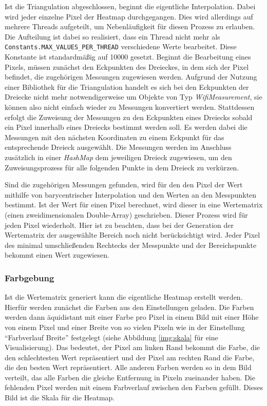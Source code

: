 \documentclass[10pt]{scrartcl}
\newcommand{\inlcode}{\texttt}
\begin{document}
Ist die Triangulation abgeschlossen, beginnt die eigentliche Interpolation. Dabei wird jeder einzelne Pixel der Heatmap durchgegangen. Dies wird allerdings auf mehrere Threads aufgeteilt, um Nebenläufigkeit für diesen Prozess zu erlauben. Die Aufteilung ist dabei so realisiert, dass ein Thread nicht mehr als \inlcode{Constants.MAX\_VALUES\_PER\_THREAD} verschiedene Werte bearbeitet. Diese Konstante ist standardmäßig auf 10000 gesetzt. Beginnt die Bearbeitung eines Pixels, müssen zunächst den Eckpunkten des Dreieckes, in dem sich der Pixel befindet, die zugehörigen Messungen zugewiesen werden. Aufgrund der Nutzung einer Bibliothek für die Triangulation handelt es sich bei den Eckpunkten der Dreiecke nicht mehr notwendigerweise um Objekte von Typ \textit{WifiMeasurement}, sie können also nicht einfach wieder zu Messungen konvertiert werden. Stattdessen erfolgt die Zuweisung der Messungen zu den Eckpunkten eines Dreiecks sobald ein Pixel innerhalb eines Dreiecks bestimmt werden soll. Es werden dabei die Messungen mit den nächsten Koordinaten zu einem Eckpunkt für das entsprechende Dreieck ausgewählt. Die Messungen werden im Anschluss zusätzlich in einer \textit{HashMap} dem jeweiligen Dreieck zugewiesen, um den Zuweisungsprozess für alle folgenden Punkte in dem Dreieck zu verkürzen.

Sind die zugehörigen Messungen gefunden, wird für den den Pixel der Wert mithilfe von barycentrischer Interpolation und den Werten an den Messpunkten bestimmt. Ist der Wert für einen Pixel berechnet, wird dieser in eine Wertematrix (einen zweidimensionalen Double-Array) geschrieben. Dieser Prozess wird für jeden Pixel wiederholt. Hier ist zu beachten, dass bei der Generation der Wertematrix der ausgewählte Bereich noch nicht berücksichtigt wird. Jeder Pixel des minimal umschließenden Rechtecks der Messpunkte und der Bereichspunkte bekommt einen Wert zugewiesen.

\subsubsection{Farbgebung}
\label{Farbgebung}
Ist die Wertematrix generiert kann die eigentliche Heatmap erstellt werden. Hierfür werden zunächst die Farben aus den Einstellungen geladen. Die Farben werden dann äquidistant mit einer Farbe pro Pixel in einem Bild mit einer Höhe von einem Pixel und einer Breite von so vielen Pixeln wie in der Einstellung \enquote{Farbverlauf Breite} festgelegt (siehe Abbildung \ref{img:skala} für eine Visualisierung). Das bedeutet, der Pixel am linken Rand bekommt die Farbe, die den schlechtesten Wert repräsentiert und der Pixel am rechten Rand die Farbe, die den besten Wert repräsentiert. Alle anderen Farben werden so in dem Bild verteilt, das alle Farben die gleiche Entfernung in Pixeln zueinander haben. Die fehlenden Pixel werden mit einem Farbverlauf zwischen den Farben gefüllt. Dieses Bild ist die Skala für die Heatmap.
\end{document}
